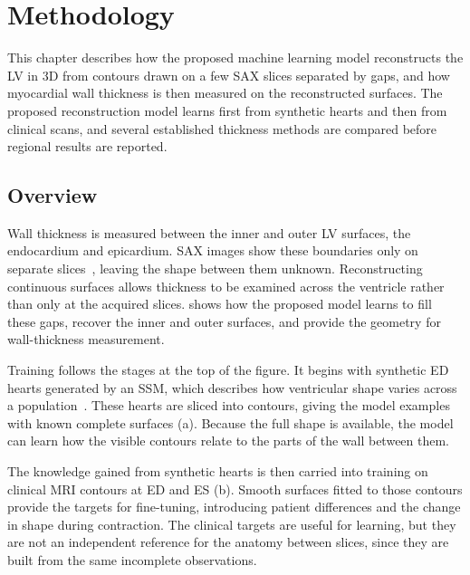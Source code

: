 \chapter{Methodology}
\label{ch:methodology}

\noindent
This chapter describes how the proposed machine learning model reconstructs
the LV in 3D from contours drawn on a few SAX slices separated by gaps, and
how myocardial wall thickness is then measured on the reconstructed surfaces.
The proposed reconstruction model learns first from synthetic hearts and then from clinical scans, and
several established thickness methods are compared before regional results
are reported.

\section{Overview}
\label{sec:method-overview}
\noindent
Wall thickness is measured between the inner and outer LV surfaces, the
endocardium and epicardium. SAX images show these boundaries only on separate
slices~\parencite{kramer2020cmrprotocols,bernard2018acdc}, leaving the shape
between them unknown. Reconstructing continuous surfaces allows thickness to
be examined across the ventricle rather than only at the acquired slices.
 shows how the proposed model learns to fill
these gaps, recover the inner and outer surfaces, and provide the
geometry for wall-thickness measurement.

Training follows the stages at the top of the figure. It begins with
synthetic ED hearts generated by an SSM, which describes how ventricular
shape varies across a population~\parencite{cootes1995asm,bai2015biventricularatlas}.
These hearts are sliced into contours, giving the model examples with known
complete surfaces (a). Because the full shape is available, the model can
learn how the visible contours relate to the parts of the wall between them.

The knowledge gained from synthetic hearts is then carried into training on
clinical MRI contours at ED and ES (b). Smooth surfaces fitted to those
contours provide the targets for fine-tuning, introducing patient differences
and the change in shape during contraction. The clinical targets are useful
for learning, but they are not an independent reference for the anatomy
between slices, since they are built from the same incomplete observations.

